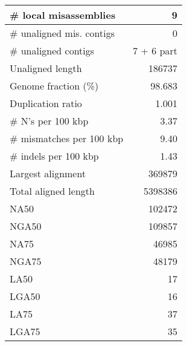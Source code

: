 \documentclass[12pt,a4paper]{article}
\begin{document}
\begin{table}[ht]
\begin{center}
\begin{tabular}{|l*{1}{|r}|}
\# local misassemblies & 9 \\ \hline
\# unaligned mis. contigs & 0 \\ \hline
\# unaligned contigs & 7 + 6 part \\ \hline
Unaligned length & 186737 \\ \hline
Genome fraction (\%) & 98.683 \\ \hline
Duplication ratio & 1.001 \\ \hline
\# N's per 100 kbp & 3.37 \\ \hline
\# mismatches per 100 kbp & 9.40 \\ \hline
\# indels per 100 kbp & 1.43 \\ \hline
Largest alignment & 369879 \\ \hline
Total aligned length & 5398386 \\ \hline
NA50 & 102472 \\ \hline
NGA50 & 109857 \\ \hline
NA75 & 46985 \\ \hline
NGA75 & 48179 \\ \hline
LA50 & 17 \\ \hline
LGA50 & 16 \\ \hline
LA75 & 37 \\ \hline
LGA75 & 35 \\ \hline
\end{tabular}
\end{center}
\end{table}
\end{document}

